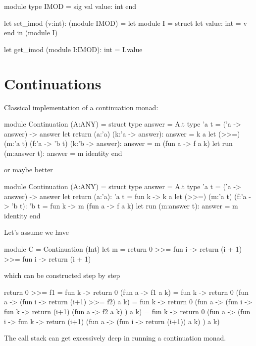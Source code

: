 \begin{ocaml}
  module type IMOD =
    sig
      val value: int
    end

  let set_imod (v:int): (module IMOD) =
    let module I =
      struct
        let value: int = v
      end in
    (module I)

  let get_imod (module I:IMOD): int =
    I.value
\end{ocaml}





\section{Continuations}

Classical implementation of a continuation monad:
%
\begin{ocaml}
  module Continuation (A:ANY) =
  struct
    type answer = A.t
    type 'a t = ('a -> answer) -> answer
    let return (a:'a) (k:'a -> answer): answer =
      k a
    let (>>=) (m:'a t) (f:'a -> 'b t) (k:'b -> answer): answer =
      m (fun a -> f a k)
    let run (m:answer t): answer =
       m identity
  end
\end{ocaml}
%
or maybe better
\begin{ocaml}
  module Continuation (A:ANY) =
  struct
    type answer = A.t
    type 'a t = ('a -> answer) -> answer
    let return (a:'a): 'a t =
      fun k -> k a
    let (>>=) (m:'a t) (f:'a -> 'b t): 'b t =
      fun k -> m (fun a -> f a k)
    let run (m:answer t): answer =
       m identity
  end
\end{ocaml}

Let's assume we have
\begin{ocaml}
   module C = Continuation (Int)
   let m = return 0 >>= fun i -> return (i + 1) >>= fun i -> return (i + 1)
\end{ocaml}
%
which can be constructed step by step
\begin{ocaml}
  return 0 >>= f1
  =
  fun k -> return 0 (fun a -> f1 a k)
  =
  fun k -> return 0 (fun a -> (fun i -> return (i+1) >>= f2) a k)
  =
  fun k -> return
             0
             (fun a -> (fun i ->
                          fun k ->
                            return
                              (i+1)
                              (fun a -> f2 a k)
                       ) a k)
  =
  fun k -> return
             0
             (fun a -> (fun i ->
                          fun k ->
                            return
                              (i+1)
                              (fun a -> (fun i -> return (i+1)) a k)
                       ) a k)
\end{ocaml}
%
The call stack can get excessively deep in running a continuation monad.

